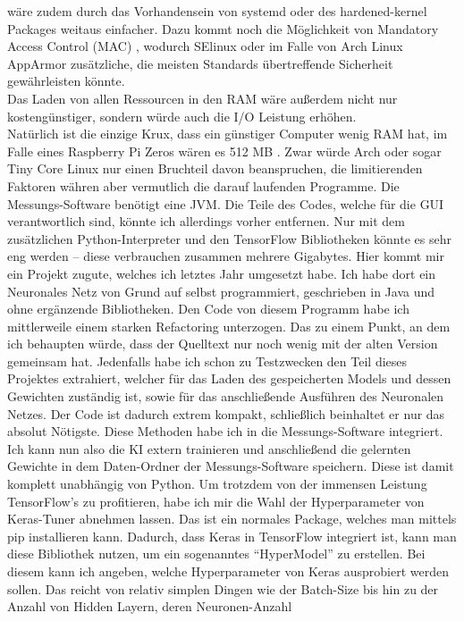 \documentclass[10pt]{article}
\begin{document}
wäre zudem durch das Vorhandensein von systemd oder des hardened-kernel Packages weitaus einfacher. Dazu kommt noch die Möglichkeit von Mandatory Access Control (MAC) \autocite{MAC},
wodurch SElinux oder im Falle von Arch Linux AppArmor \autocite{SElinuxAndAppArmor} zusätzliche, die meisten Standards übertreffende Sicherheit gewährleisten könnte.\\
Das Laden von allen Ressourcen in den RAM wäre außerdem nicht nur kostengünstiger, sondern würde auch die I/O Leistung erhöhen.\\
Natürlich ist die einzige Krux, dass ein günstiger Computer wenig RAM hat, 
im Falle eines Raspberry Pi Zeros wären es 512 MB \autocite{PI0Specs}. Zwar würde Arch oder sogar Tiny Core Linux nur einen Bruchteil davon beanspruchen, die limitierenden Faktoren
währen aber vermutlich die darauf laufenden Programme. Die Messungs-Software benötigt eine JVM. Die Teile des Codes, welche für die GUI verantwortlich sind, könnte ich allerdings vorher 
entfernen. Nur mit dem zusätzlichen Python-Interpreter und den TensorFlow Bibliotheken könnte es sehr eng werden – diese verbrauchen zusammen mehrere Gigabytes.
Hier kommt mir ein Projekt zugute, welches ich letztes Jahr umgesetzt habe. Ich habe dort ein Neuronales Netz von Grund auf selbst programmiert, geschrieben in Java und ohne 
ergänzende Bibliotheken. Den Code von diesem Programm habe ich mittlerweile einem starken Refactoring unterzogen. 
Das zu einem Punkt, an dem ich behaupten würde, dass der Quelltext nur noch wenig mit der alten Version gemeinsam hat. Jedenfalls habe ich schon zu Testzwecken den Teil dieses 
Projektes extrahiert, welcher für das Laden des gespeicherten Models und dessen Gewichten zuständig ist, sowie für das anschließende Ausführen des Neuronalen Netzes.
Der Code ist dadurch extrem kompakt, schließlich beinhaltet er nur das absolut Nötigste. Diese Methoden habe ich in die Messungs-Software integriert. Ich kann nun also
die KI extern trainieren und anschließend die gelernten Gewichte in dem Daten-Ordner der Messungs-Software speichern. Diese ist damit komplett unabhängig von Python. 
Um trotzdem von der immensen Leistung TensorFlow's zu profitieren, habe ich mir die Wahl der Hyperparameter von Keras-Tuner abnehmen lassen. Das ist ein normales Package, welches man
mittels pip installieren kann. Dadurch, dass Keras in TensorFlow integriert ist, kann man diese Bibliothek nutzen, um ein sogenanntes "`HyperModel"' zu erstellen. Bei diesem kann ich angeben, 
welche Hyperparameter von Keras ausprobiert werden sollen. Das reicht von relativ simplen Dingen wie der Batch-Size bis hin zu der Anzahl von Hidden Layern, deren Neuronen-Anzahl
\end{document}
